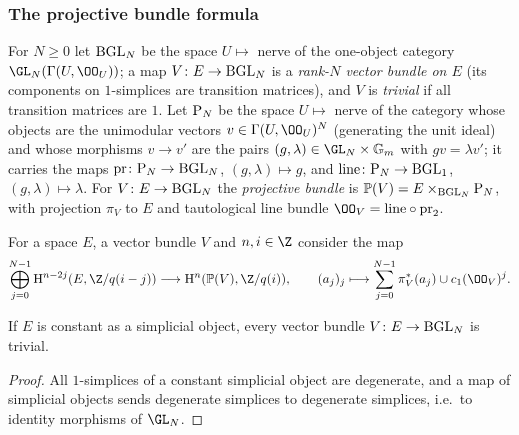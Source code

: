 \subsubsection{The projective bundle formula}

\begin{definition}\label{pf:steps1:def:bgl}
For $N\ge0$ let $\mathrm{BGL}_N$ be the space $U\mapsto$ nerve of the one-object category
$\GL_N(\Gamma(U,\OO_U))$; a map $V\colon E\to\mathrm{BGL}_N$ is a \emph{rank-$N$ vector bundle on $E$} (its
components on $1$-simplices are transition matrices), and $V$ is \emph{trivial} if all transition matrices
are $1$. Let $\mathrm{P}_N$ be the space $U\mapsto$ nerve of the category whose objects are the unimodular
vectors $v\in\Gamma(U,\OO_U)^N$ (generating the unit ideal) and whose morphisms $v\to v'$ are the pairs
$(g,\lambda)\in\GL_N\times\mathbb G_m$ with $gv=\lambda v'$; it carries the maps
$\mathrm{pr}\colon\mathrm{P}_N\to\mathrm{BGL}_N$, $(g,\lambda)\mapsto g$, and $\mathrm{line}\colon\mathrm{P}_N\to\mathrm{BGL}_1$,
$(g,\lambda)\mapsto\lambda$. For $V\colon E\to\mathrm{BGL}_N$ the \emph{projective bundle} is
$\mathbb P(V)=E\times_{\mathrm{BGL}_N}\mathrm{P}_N$, with projection $\pi_V$ to $E$ and tautological line bundle
$\OO_V=\mathrm{line}\circ\mathrm{pr}_2$.
  
\end{definition}

For a space $E$, a vector bundle $V$ and $n,i\in\Z$ consider the map
\begin{equation}\label{pf:steps1:eq:pbf}
 \bigoplus_{j=0}^{N-1}\stepsIH^{n-2j}(E,\Z/q(i-j))\longrightarrow\stepsIH^n(\mathbb P(V),\Z/q(i)),\qquad
 (a_j)_j\longmapsto\sum_{j=0}^{N-1}\pi_V^*(a_j)\cup c_1(\OO_V)^j .
\end{equation}

\begin{lemma}\label{pf:steps1:disc}
If $E$ is constant as a simplicial object, every vector bundle $V\colon E\to\mathrm{BGL}_N$ is trivial.
\end{lemma}

\begin{proof}
All $1$-simplices of a constant simplicial object are degenerate, and a map of simplicial objects sends
degenerate simplices to degenerate simplices, i.e.\ to identity morphisms of $\GL_N$.
\end{proof}

